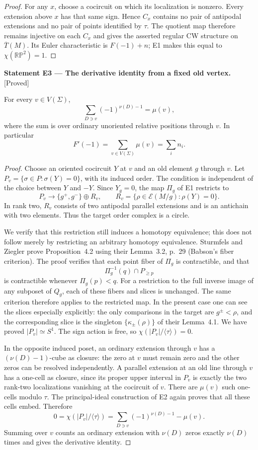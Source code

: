 \documentclass[11pt,a4paper]{article}
\newenvironment{resultenv}[3]{\par\medskip\phantomsection\label{#1}\noindent\textbf{Statement #1 --- #3.}\quad\textsf{[#2]}\par\smallskip\noindent\ignorespaces}{\par\medskip}
\begin{document}
\begin{proof}
For any $x$, choose a cocircuit on which its localization is nonzero. Every
extension above $x$ has that same sign. Hence $C_x$ contains no pair of
antipodal extensions and no pair of points identified by $\tau$. The quotient
map therefore remains injective on each $C_x$ and gives the asserted regular
CW structure on $\overline T(M)$. Its Euler characteristic is
$F(-1)+n$; E1 makes this equal to $\chi(\mathbb {RP}^2)=1$.
\end{proof}

\begin{resultenv}{E3}{Proved}{The derivative identity from a fixed old vertex}
For every $v\in V(\Sigma)$,
\[
 \sum_{D\ni v}(-1)^{\nu(D)-1}=\mu(v),
\]
where the sum is over ordinary unoriented relative positions through $v$.
In particular
\[
 \boxed{F'(-1)=\sum_{v\in V(\Sigma)}\mu(v)=\sum_i n_i.}
\]
\end{resultenv}
\begin{proof}
Choose an oriented cocircuit $Y$ at $v$ and an old element $g$ through $v$.
Let $P_v=\{\sigma\in P:\sigma(Y)=0\}$, with its induced order. The condition
is independent of the choice between $Y$ and $-Y$. Since $Y_g=0$, the map
$\Pi_g$ of E1 restricts to
\[
 P_v\longrightarrow\{g^+,g^-\}\oplus R_v,
 \qquad R_v=\{\rho\in\mathcal E(M/g):\rho(Y)=0\}.
\]
In rank two, $R_v$ consists of two antipodal parallel extensions and is an
antichain with two elements. Thus the target order complex is a circle.

We verify that this restriction still induces a homotopy equivalence; this
does not follow merely by restricting an arbitrary homotopy equivalence.
Sturmfels and Ziegler prove Proposition~4.2 using their Lemma~3.2, p.~29
(Babson's fiber criterion). The proof verifies that each point fiber of
$\Pi_g$ is contractible, and that
\[
 \Pi_g^{-1}(q)\cap P_{\geq p}
\]
is contractible whenever $\Pi_g(p)<q$. For a restriction to the full inverse
image of any subposet of $Q_g$, each of these fibers and slices is unchanged.
The same criterion therefore applies to the restricted map. In the present
case one can see the slices especially explicitly: the only comparisons
in the target are $g^\pm<\rho$, and the corresponding slice is the singleton
$\{\kappa_\pm(\rho)\}$ of their Lemma~4.1. We have proved $|P_v|\simeq S^1$.
The sign action is free, so $\chi(|P_v|/\langle\tau\rangle)=0$.

In the opposite induced poset, an ordinary extension through $v$ has a
$(\nu(D)-1)$-cube as closure: the zero at $v$ must remain zero and the other
zeros can be resolved independently. A parallel extension at an old line
through $v$ has a one-cell as closure, since its proper upper interval in
$P_v$ is exactly the two rank-two localizations vanishing at the cocircuit
of $v$. There are $\mu(v)$ such one-cells modulo $\tau$. The principal-ideal
construction of E2 again proves that all these cells embed. Therefore
\[
 0=\chi(|P_v|/\langle\tau\rangle)
   =\sum_{D\ni v}(-1)^{\nu(D)-1}-\mu(v).
\]
Summing over $v$ counts an ordinary extension with $\nu(D)$ zeros exactly
$\nu(D)$ times and gives the derivative identity.
\end{proof}
\end{document}

